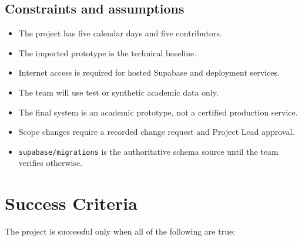\documentclass[
  10pt,
  a4paper,
  oneside]{report}
\providecommand{\tightlist}{%
  \setlength{\itemsep}{0pt}\setlength{\parskip}{0pt}}
\begin{document}
\section{Constraints and
assumptions}\label{47-constraints-and-assumptions}

\begin{itemize}
\tightlist
\item
  The project has five calendar days and five contributors.
\item
  The imported prototype is the technical baseline.
\item
  Internet access is required for hosted Supabase and deployment
  services.
\item
  The team will use test or synthetic academic data only.
\item
  The final system is an academic prototype, not a certified production
  service.
\item
  Scope changes require a recorded change request and Project Lead
  approval.
\item
  \texttt{supabase/migrations} is the authoritative schema source until
  the team verifies otherwise.
\end{itemize}

\chapter{Success Criteria}\label{5-success-criteria}

The project is successful only when all of the following are true:
\end{document}
